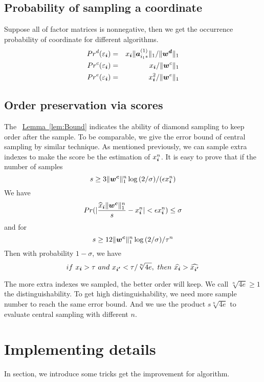 \documentclass[letterpaper]{article}
\newcommand{\V}[1]{{\bm{{\MakeLowercase{#1}}}}}
\newcommand{\Varow}[1]{\V{a}^{(#1)}_{i_#1*}}
\newcommand{\norm}[2]{\|#1\|_{#2}}
\newcommand{\Lem}[1] {\hyperref[lem:#1] {Lemma~\ref*{lem:#1}}} %
\begin{document}
\subsection{Probability of sampling a coordinate}

Suppose all of factor matrices is nonnegative, then we get the occurrence probability of coordinate for different algorithms.
\begin{eqnarray}
    \label{eq:ProbabilityDianomd}
    Pr^d(\varepsilon_{\V{i}}) & = & x_\V{i}\norm{\Varow{1}}{1}/\norm{\V{W^d}}{1}\\
    \label{eq:ProbabilityCentral}
    Pr^c(\varepsilon_{\V{i}}) & = & x_{\V{i}}/\norm{\V{W}^c}{1}\\
    \label{eq:ProbabilityExtensiom}
    Pr^e(\varepsilon_{\V{i}}) & = & x_{\V{i}}^2/\norm{\V{w}^e}{1}
\end{eqnarray}

\subsection{Order preservation via scores}

The ~\Lem{Bound} indicates the ability of diamond sampling to keep order after the sample. To be comparable, we give the error bound of central sampling by similar technique.
As mentioned previously, we can sample extra indexes to make the score be the estimation of $x^n_{\V{i}}$. It is easy to prove that if the number of samples
\[
s \geq 3\norm{\V{w^c}}{1}^n\log{(2/\sigma)}/(\epsilon x^n_{\V{i}})
\]
We have
\[
Pr(|\frac{\widehat{x}_\V{i}\norm{\V{w^c}}{1}^n}{s} - x^n_{\V{i}}| < \epsilon x^n_{\V{i}}) \leq \sigma
\]
and for
\[
    s \geq 12\norm{\V{w^c}}{1}^n\log{(2/\sigma)}/\tau^n
\]
Then with probability $1-\sigma$, we have
\[
if\ x_{\V{i}} > \tau\ and \ x_{\V{i'}} < \tau/\sqrt[n]{4e}, \ then\ \widehat{x_{\V{i}}} > \widehat{x_{\V{i'}}}
\]

The more extra indexes we sampled, the better order will keep. We call $\sqrt[n]{4e}\geq 1$ the distinguishability. To get high distinguishability, we need more sample number to reach the same error bound. And we use the product $s\sqrt[n]{4e}$ to evaluate central sampling with different $n$.
\section{Implementing details}
In section, we introduce some tricks get the improvement for algorithm.
\end{document}
